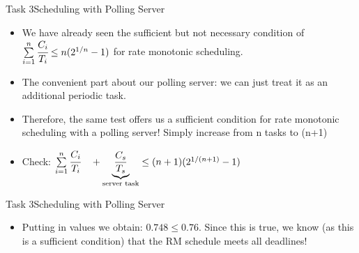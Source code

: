 \begin{frame}{Task 3}{Scheduling with Polling Server}
    \begin{solutionnoinc}
    \begin{itemize}
        \item We have already seen the sufficient but not necessary condition of $\sum\limits_{i=1}^{n}\cfrac{C_i}{T_i} \leq n(2^{1/n}-1)$ for rate monotonic scheduling.
        \item The convenient part about our polling server: we can just treat it as an additional \alert{periodic} task.
        \item Therefore, the same test offers us a sufficient condition for rate monotonic scheduling with a polling server! Simply increase from n tasks to (n+1)
        \item Check: $\sum\limits_{i=1}^{n}\cfrac{C_i}{T_i} \quad + \underbrace{\frac{C_s}{T_s}}_{\text{server task}} \leq (n+1)(2^{1/(n+1)}-1)$
    \end{itemize}
    \end{solutionnoinc}
\end{frame}
\begin{frame}{Task 3}{Scheduling with Polling Server}
    \begin{solution}
    \begin{itemize}
        \item Putting in values we obtain: $0.748 \leq 0.76$. Since this is true, we know (as this is a sufficient condition) that the RM schedule meets all deadlines!
    \end{itemize}
    \end{solution}
\end{frame}